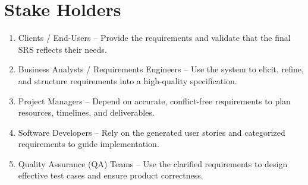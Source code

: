 \section{Stake Holders}
\begin{enumerate}
\item Clients / End-Users – Provide the requirements and validate that the final SRS reflects their needs.
\item Business Analysts / Requirements Engineers – Use the system to elicit, refine, and structure requirements into a high-quality specification.
\item Project Managers – Depend on accurate, conflict-free requirements to plan resources, timelines, and deliverables.
\item Software Developers – Rely on the generated user stories and categorized requirements to guide implementation.
\item Quality Assurance (QA) Teams – Use the clarified requirements to design effective test cases and ensure product correctness.
\end{enumerate}
